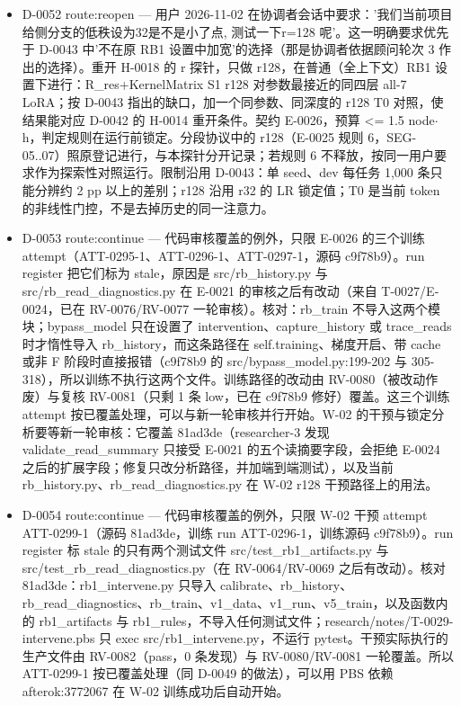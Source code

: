 \documentclass[11pt]{article}
\begin{document}
\begin{itemize}
\item D-0052 route:reopen --- 用户 2026-11-02 在协调者会话中要求：'我们当前项目给侧分支的低秩设为32是不是小了点, 测试一下r=128 呢'。这一明确要求优先于 D-0043 中'不在原 RB1 设置中加宽'的选择（那是协调者依据顾问轮次 3 作出的选择）。重开 H-0018 的 r 探针，只做 r128，在普通（全上下文）RB1 设置下进行：R\_res+KernelMatrix S1 r128 对参数最接近的同四层 all-7 LoRA；按 D-0043 指出的缺口，加一个同参数、同深度的 r128 T0 对照，使结果能对应 D-0042 的 H-0014 重开条件。契约 E-0026，预算 \textless{}= 1.5 node\ensuremath{\cdot}h，判定规则在运行前锁定。分段协议中的 r128（E-0025 规则 6，SEG-05..07）照原登记进行，与本探针分开记录；若规则 6 不释放，按同一用户要求作为探索性对照运行。限制沿用 D-0043：单 seed、dev 每任务 1,000 条只能分辨约 2 pp 以上的差别；r128 沿用 r32 的 LR 锁定值；T0 是当前 token 的非线性门控，不是去掉历史的同一注意力。
\item D-0053 route:continue --- 代码审核覆盖的例外，只限 E-0026 的三个训练 attempt（ATT-0295-1、ATT-0296-1、ATT-0297-1，源码 c9f78b9）。run register 把它们标为 stale，原因是 src/rb\_history.py 与 src/rb\_read\_diagnostics.py 在 E-0021 的审核之后有改动（来自 T-0027/E-0024，已在 RV-0076/RV-0077 一轮审核）。核对：rb\_train 不导入这两个模块；bypass\_model 只在设置了 intervention、capture\_history 或 trace\_reads 时才惰性导入 rb\_history，而这条路径在 self.training、梯度开启、带 cache 或非 F 阶段时直接报错（c9f78b9 的 src/bypass\_model.py:199-202 与 305-318），所以训练不执行这两个文件。训练路径的改动由 RV-0080（被改动作废）与复核 RV-0081（只剩 1 条 low，已在 c9f78b9 修好）覆盖。这三个训练 attempt 按已覆盖处理，可以与新一轮审核并行开始。W-02 的干预与锁定分析要等新一轮审核：它覆盖 81ad3de（researcher-3 发现 validate\_read\_summary 只接受 E-0021 的五个读摘要字段，会拒绝 E-0024 之后的扩展字段；修复只改分析路径，并加端到端测试），以及当前 rb\_history.py、rb\_read\_diagnostics.py 在 W-02 r128 干预路径上的用法。
\item D-0054 route:continue --- 代码审核覆盖的例外，只限 W-02 干预 attempt ATT-0299-1（源码 81ad3de，训练 run ATT-0296-1，训练源码 c9f78b9）。run register 标 stale 的只有两个测试文件 src/test\_rb1\_artifacts.py 与 src/test\_rb\_read\_diagnostics.py（在 RV-0064/RV-0069 之后有改动）。核对 81ad3de：rb1\_intervene.py 只导入 calibrate、rb\_history、rb\_read\_diagnostics、rb\_train、v1\_data、v1\_run、v5\_train，以及函数内的 rb1\_artifacts 与 rb1\_rules，不导入任何测试文件；research/notes/T-0029-intervene.pbs 只 exec src/rb1\_intervene.py，不运行 pytest。干预实际执行的生产文件由 RV-0082（pass，0 条发现）与 RV-0080/RV-0081 一轮覆盖。所以 ATT-0299-1 按已覆盖处理（同 D-0049 的做法），可以用 PBS 依赖 afterok:3772067 在 W-02 训练成功后自动开始。

\end{itemize}
\end{document}
